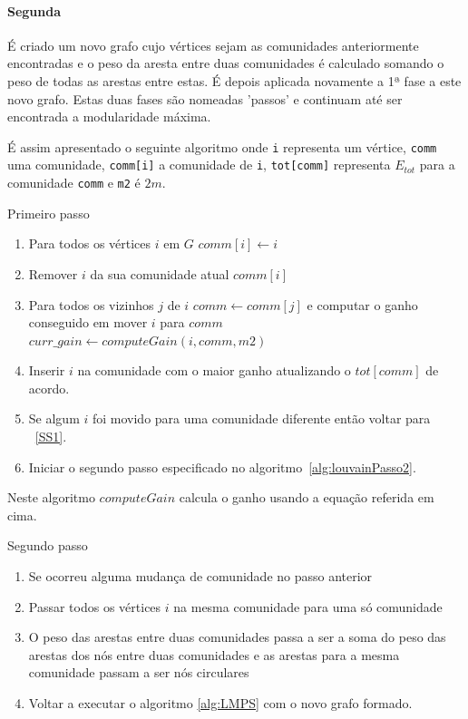 \paragraph{Segunda}
É criado um novo grafo cujo vértices sejam as comunidades anteriormente encontradas e o peso da aresta entre duas comunidades é calculado somando o peso de todas as arestas entre estas. É depois aplicada novamente a 1ª fase a este novo grafo.
Estas duas fases são nomeadas 'passos' e continuam até ser encontrada a modularidade máxima.


É assim apresentado o seguinte algoritmo onde \verb|i| representa um vértice, \verb|comm| uma comunidade, \verb|comm[i]| a comunidade de \verb|i|, \verb|tot[comm]| representa $E_{tot}$ para a comunidade \verb|comm| e \verb|m2| é $2m$.
\begin{algorithm}
\caption{Primeiro passo}
\label{alg:LMPS}

	\begin{enumerate}
		\item Para todos os vértices $i$ em $G$ $comm[i] \gets i$
		\label{SS1}
		\item Remover $i$ da sua comunidade atual $comm[i]$
		\item Para todos os vizinhos $j$ de $i$ $comm \gets comm[j]$ e computar o ganho conseguido em mover $i$ para $comm$ $curr\_gain \gets computeGain(i,comm,m2)$
		\item Inserir $i$ na comunidade com o maior ganho atualizando o $tot[comm]$ de acordo.
		\item Se algum $i$ foi movido para uma comunidade diferente então voltar para ~\ref{SS1}.
		\item Iniciar o segundo passo especificado no algoritmo~\ref{alg:louvainPasso2}.
	\end{enumerate}
\end{algorithm}


Neste algoritmo $computeGain$ calcula o ganho usando a equação referida em cima.

\begin{algorithm}
\caption{Segundo passo}
\label{alg:louvainPasso2}
	\begin{enumerate}
		\item Se ocorreu alguma mudança de comunidade no passo anterior
		\item Passar todos os vértices $i$ na mesma comunidade para uma só comunidade
		\item O peso das arestas entre duas comunidades passa a ser a soma do peso das arestas dos nós entre duas comunidades e as arestas para a mesma comunidade passam a ser nós circulares
		\item Voltar a executar o algoritmo \ref{alg:LMPS} com o novo grafo formado.
	\end{enumerate}
\end{algorithm}


